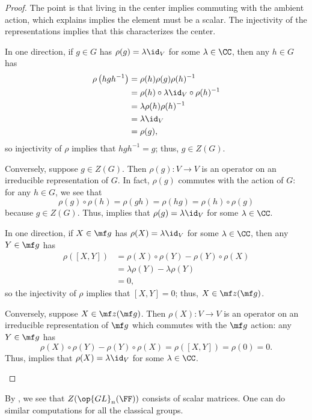 \documentclass[../notes.tex]{subfiles}
\begin{document}
\begin{proof}
	The point is that living in the center implies commuting with the ambient action, which  explains implies the element must be a scalar. The injectivity of the representations implies that this characterizes the center.
	\begin{listalph}
		\item In one direction, if $g\in G$ has $\rho(g)=\lambda\id_V$ for some $\lambda\in\CC$, then any $h\in G$ has
		\begin{align*}
			\rho\left(hgh^{-1}\right) &= \rho(h)\rho(g)\rho(h)^{-1} \\
			&= \rho(h)\circ{\lambda\id_V}\circ\rho(h)^{-1} \\
			&= \lambda\rho(h)\rho(h)^{-1} \\
			&= \lambda\id_V \\
			&= \rho(g),
		\end{align*}
		so injectivity of $\rho$ implies that $hgh^{-1}=g$; thus, $g\in Z(G)$.

		Conversely, suppose $g\in Z(G)$. Then $\rho(g)\colon V\to V$ is an operator on an irreducible representation of $G$. In fact, $\rho(g)$ commutes with the action of $G$: for any $h\in G$, we see that
		\[\rho(g)\circ\rho(h)=\rho(gh)=\rho(hg)=\rho(h)\circ\rho(g)\]
		because $g\in Z(G)$. Thus,  implies that $\rho(g)=\lambda\id_V$ for some $\lambda\in\CC$.

		\item In one direction, if $X\in\mf g$ has $\rho(X)=\lambda\id_V$ for some $\lambda\in\CC$, then any $Y\in\mf g$ has
		\begin{align*}
			\rho([X,Y]) &= \rho(X)\circ\rho(Y)-\rho(Y)\circ\rho(X) \\
			&= \lambda\rho(Y)-\lambda\rho(Y) \\
			&= 0,
		\end{align*}
		so the injectivity of $\rho$ implies that $[X,Y]=0$; thus, $X\in\mf z(\mf g)$.
		
		Conversely, suppose $X\in\mf z(\mf g)$. Then $\rho(X)\colon V\to V$ is an operator on an irreducible representation of $\mf g$ which commutes with the $\mf g$ action: any $Y\in\mf g$ has
		\[\rho(X)\circ\rho(Y)-\rho(Y)\circ\rho(X)=\rho([X,Y])=\rho(0)=0.\]
		Thus,  implies that $\rho(X)=\lambda\id_V$ for some $\lambda\in\CC$.
		\qedhere
	\end{listalph}
\end{proof}
\begin{example}
	By , we see that $Z({\op{GL}_n(\FF)})$ consists of scalar matrices. One can do similar computations for all the classical groups.
\end{example}
\end{document}
